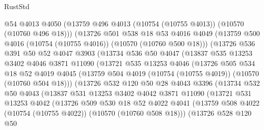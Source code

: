 \begin{lexlean}{RustStd}
\begin{coremodule}
            @54
            @4013
            @4050
            (@13759 @496 @4013 (@10754 (@10755 @4013)) (@10570 (@10760 @496 @18)))
            (@13726
              @501
              @538
              @18
              @53
              @4016
              @4049
              (@13759 @500 @4016 (@10754 (@10755 @4016)) (@10570 (@10760 @500 @18)))
              (@13726
                @536
                @391
                @50
                @52
                @4047
                @3903
                (@13734
                  @536
                  @50
                  @4047
                  (@13837
                    @535
                    @13253
                    @3402
                    @4046
                    @3871
                    @11090
                    (@13721
                      @535
                      @13253
                      @4046
                      (@13726
                        @505
                        @534
                        @18
                        @52
                        @4019
                        @4045
                        (@13759 @504 @4019 (@10754 (@10755 @4019)) (@10570 (@10760 @504 @18)))
                        (@13726
                          @532
                          @120
                          @50
                          @28
                          @4043
                          @3396
                          (@13734
                            @532
                            @50
                            @4043
                            (@13837
                              @531
                              @13253
                              @3402
                              @4042
                              @3871
                              @11090
                              (@13721
                                @531
                                @13253
                                @4042
                                (@13726
                                  @509
                                  @530
                                  @18
                                  @52
                                  @4022
                                  @4041
                                  (@13759
                                    @508
                                    @4022
                                    (@10754 (@10755 @4022))
                                    (@10570 (@10760 @508 @18)))
                                  (@13726
                                    @528
                                    @120
                                    @50

\end{coremodule}
\end{lexlean}
